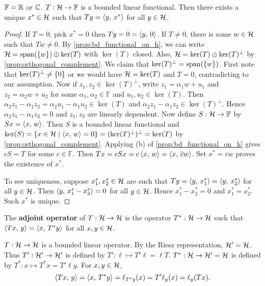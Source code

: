 \begin{theorem}
    $\mathbb{F} = \mathbb{R}$ or $\mathbb{C}$. $T:\mathcal{H}\to\mathbb{F}$ is a bounded linear 
    functional. Then there exists a unique $x^*\in\mathcal{H}$ such that 
    $Ty = \left\langle {y},\, {x^*} \right\rangle$ for all $y\in\mathcal{H}$.
\end{theorem}
\begin{proof}
    If $T = 0$, pick $x^* = 0$ then $Ty = 0 = \left\langle {y},\, {0} \right\rangle$. If $T\neq 0$, 
    there is some $w\in\mathcal{H}$ such that $Tw\neq 0$. By 
    \cref{prop:bd_functional_on_h}, we can write $\mathcal{H} = \operatorname{span}(\left\{ {w} \right\})\oplus\ker(T)$ 
    with $\ker(T)$ closed. Also, $\mathcal{H} = \ker(T)\oplus\ker(T)^{\perp}$ by 
    \cref{prop:orthogonal_complement}. We claim that $\ker(T)^{\perp} = \operatorname{span}(\left\{ {w} \right\})$. 
    First note that $\ker(T)^{\perp}\neq \left\{ {0} \right\}$ or we would have 
    $\mathcal{H} = \ker(T)$ and $T = 0$, contradicting to our assumption. Now if 
    $z_1,z_2\in\ker(T)^\perp$, write $z_1 = \alpha_1 w + u_1$ and 
    $z_2 = \alpha_2 w + u_2$ for some $\alpha_1,\alpha_2\in\mathbb{F}$ and 
    $u_1,u_2\in\ker(T)$. Then $\alpha_2z_1 - \alpha_1z_2 
    = \alpha_2u_1 - \alpha_1u_2\in\ker(T)$ and $\alpha_2z_1 - \alpha_1z_2
    \in\ker(T)^\perp$. Hence $\alpha_2z_1 - \alpha_1z_2 = 0$ and $z_1,z_2$ 
    are linearly dependent. Now define $S:\mathcal{H}\to\mathbb{F}$ by $Sx = \left\langle {x},\, {w} \right\rangle$. 
    Then $S$ is a bounded linear functional and $\ker(S) = \left\{ x\in\mathcal{H} \;\middle\vert\; \left\langle {x},\, {w} \right\rangle = 0 \right\} 
    = (\ker(T)^\perp)^\perp = \ker(T)$ by \cref{prop:orthogonal_complement}. 
    Applying (b) of \cref{prop:bd_functional_on_h} gives $cS = T$ for some 
    $c\in\mathbb{F}$. Then $Tx = cSx = c\left\langle {x},\, {w} \right\rangle = \left\langle {x},\, {\overline{c}w} \right\rangle$. 
    Set $x^* = \overline{c}w$ proves the existence of $x^*$. 

    To see uniqueness, suppose $x_1^*,x_2^*\in\mathcal{H}$ are such that 
    $Ty = \left\langle {y},\, {x_1^*} \right\rangle = \left\langle {y},\, {x_2^*} \right\rangle$ for all $y\in\mathcal{H}$. Then 
    $\left\langle {y},\, {x_1^* - x_2^*} \right\rangle = 0$ for all $y\in\mathcal{H}$. Hence 
    $x_1^* - x_2^* = 0$ and $x_1^* = x_2^*$. Such $x^*$ is unique.
\end{proof}

\begin{definition}
    The \textbf{adjoint operator} of $T:\mathcal{H}\to\mathcal{H}$ is the operator 
    $T^*:\mathcal{H}\to\mathcal{H}$ such that $\left\langle {Tx},\, {y} \right\rangle = \left\langle {x},\, {T^*y} \right\rangle$ for all $x,y\in\mathcal{H}$.
\end{definition}
\begin{remark}
    $T:\mathcal{H}\to\mathcal{H}$ is a bounded linear operator. By the Riesz representation, 
    $\mathcal{H}' = \mathcal{H}$. Thus $T':\mathcal{H}'\to\mathcal{H}'$ is defined by $T':\ell\mapsto T'\ell = \ell T$. 
    $T^*:\mathcal{H}\to\mathcal{H}' = \mathcal{H}$ is defined by $T^*:x\mapsto T^*x = T'\ell y$. 
    For $x,y\in\mathcal{H}$, 
    \begin{equation*}
        \left\langle {Tx},\, {y} \right\rangle = \left\langle {x},\, {T^*y} \right\rangle = \ell_{T^*y}(x) = T'\ell_y(x) = \ell_y(Tx).
    \end{equation*}
\end{remark}

